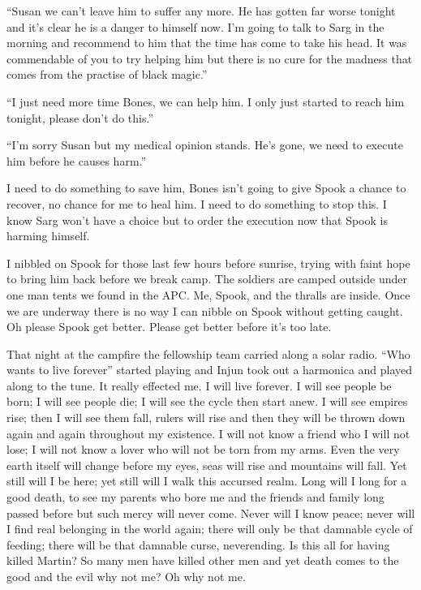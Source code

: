 ``Susan we can't leave him to suffer any more. He has gotten far worse tonight and it's clear he is a danger to himself now. I'm going to talk to Sarg in the morning and recommend to him that the time has come to take his head. It was commendable of you to try helping him but there is no cure for the madness that comes from the practise of black magic.''

``I just need more time Bones, we can help him. I only just started to reach him tonight, please don't do this.''

``I'm sorry Susan but my medical opinion stands. He's gone, we need to execute him before he causes harm.''

I need to do something to save him, Bones isn't going to give Spook a chance to recover, no chance for me to heal him. I need to do something to stop this. I know Sarg won't have a choice but to order the execution now that Spook is harming himself.

I nibbled on Spook for those last few hours before sunrise, trying with faint hope to bring him back before we break camp. The soldiers are camped outside under one man tents we found in the APC. Me, Spook, and the thralls are inside. Once we are underway there is no way I can nibble on Spook without getting caught. Oh please Spook get better. Please get better before it's too late.

\parasep



That night at the campfire the fellowship team carried along a solar radio. ``Who wants to live forever'' started playing and Injun took out a harmonica and played along to the tune. It really effected me. I will live forever. I will see people be born; I will see people die; I will see the cycle then start anew. I will see empires rise; then I will see them fall, rulers will rise and then they will be thrown down again and again throughout my existence. I will not know a friend who I will not lose; I will not know a lover who will not be torn from my arms. Even the very earth itself will change before my eyes, seas will rise and mountains will fall. Yet still will I be here; yet still will I walk this accursed realm. Long will I long for a good death, to see my parents who bore me and the friends and family long passed before but such mercy will never come. Never will I know peace; never will I find real belonging in the world again; there will only be that damnable cycle of feeding; there will be that damnable curse, neverending. Is this all for having killed Martin? So many men have killed other men and yet death comes to the good and the evil why not me? Oh why not me.

